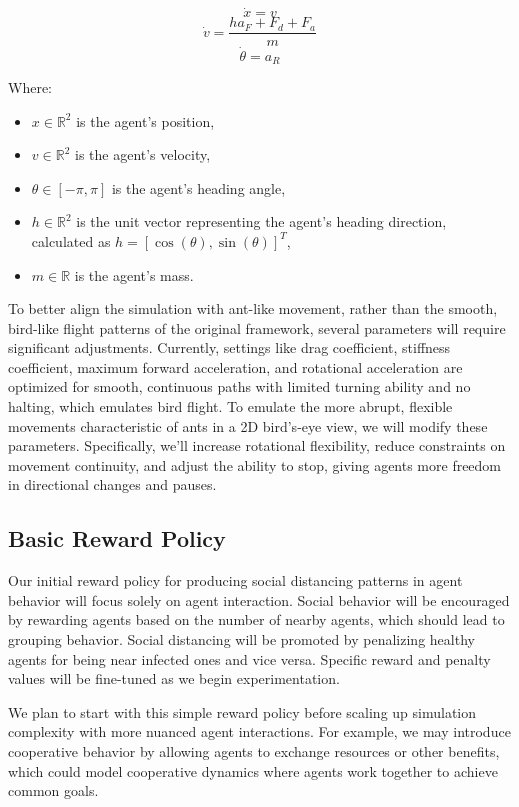 \documentclass[9pt]{IEEEtran}
\begin{document}
$$ \dot{x} = v $$  
$$ \dot{v} = \frac{ha_F + F_d + F_a}{m} $$  
$$ \dot{\theta} = a_R $$  

Where:
\begin{itemize}
    \item $x \in \mathbb{R}^2$ is the agent's position,
    \item $v \in \mathbb{R}^2$ is the agent's velocity,
    \item $\theta \in [-\pi, \pi]$ is the agent's heading angle,
    \item $h \in \mathbb{R}^2$ is the unit vector representing the agent's heading direction, calculated as $h = [\cos(\theta), \sin(\theta)]^T$,
    \item $m \in \mathbb{R}$ is the agent's mass.\\
\end{itemize}

To better align the simulation with ant-like movement, rather than the smooth, bird-like flight patterns of the original framework, several parameters will require significant adjustments. Currently, settings like drag coefficient, stiffness coefficient, maximum forward acceleration, and rotational acceleration are optimized for smooth, continuous paths with limited turning ability and no halting, which emulates bird flight. To emulate the more abrupt, flexible movements characteristic of ants in a 2D bird's-eye view, we will modify these parameters. Specifically, we’ll increase rotational flexibility, reduce constraints on movement continuity, and adjust the ability to stop, giving agents more freedom in directional changes and pauses.

\subsection{Basic Reward Policy}

Our initial reward policy for producing social distancing patterns in agent behavior will focus solely on agent interaction. Social behavior will be encouraged by rewarding agents based on the number of nearby agents, which should lead to grouping behavior. Social distancing will be promoted by penalizing healthy agents for being near infected ones and vice versa. Specific reward and penalty values will be fine-tuned as we begin experimentation.

We plan to start with this simple reward policy before scaling up simulation complexity with more nuanced agent interactions. For example, we may introduce cooperative behavior by allowing agents to exchange resources or other benefits, which could model cooperative dynamics where agents work together to achieve common goals.
\end{document}
